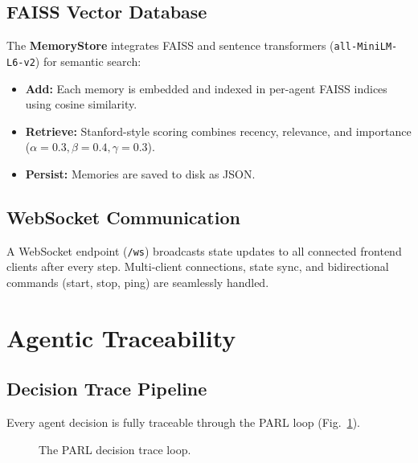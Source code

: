 \documentclass[10pt,conference]{IEEEtran}
\begin{document}
\subsection{FAISS Vector Database}

The \textbf{MemoryStore} integrates FAISS and sentence transformers (\texttt{all-MiniLM-L6-v2}) for semantic search:

\begin{itemize}
    \item \textbf{Add:} Each memory is embedded and indexed in per-agent FAISS indices using cosine similarity.
    \item \textbf{Retrieve:} Stanford-style scoring combines recency, relevance, and importance ($\alpha{=}0.3, \beta{=}0.4, \gamma{=}0.3$).
    \item \textbf{Persist:} Memories are saved to disk as JSON.
\end{itemize}

\subsection{WebSocket Communication}

A WebSocket endpoint (\texttt{/ws}) broadcasts state updates to all connected frontend clients after every step. Multi-client connections, state sync, and bidirectional commands (start, stop, ping) are seamlessly handled.

\section{Agentic Traceability}

\subsection{Decision Trace Pipeline}

Every agent decision is fully traceable through the PARL loop (Fig.~\ref{fig:parl}).

\begin{figure}[ht]
\centering
{}
\caption{The PARL decision trace loop.}
\label{fig:parl}
\end{figure}
\end{document}
